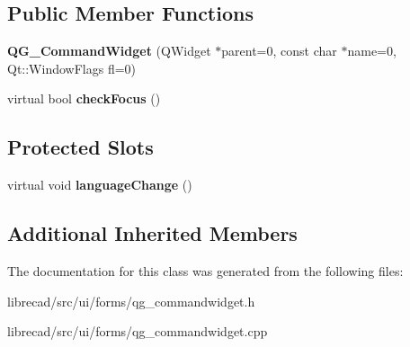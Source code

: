 \subsection*{Public Member Functions}
\begin{DoxyCompactItemize}
\item 
\hypertarget{classQG__CommandWidget_af437c9be473e893e77e6e208e02600be}{{\bfseries Q\-G\-\_\-\-Command\-Widget} (Q\-Widget $\ast$parent=0, const char $\ast$name=0, Qt\-::\-Window\-Flags fl=0)}\label{classQG__CommandWidget_af437c9be473e893e77e6e208e02600be}

\item 
\hypertarget{classQG__CommandWidget_a7bcd0c2b6c07aacb3accf4589f8cf0de}{virtual bool {\bfseries check\-Focus} ()}\label{classQG__CommandWidget_a7bcd0c2b6c07aacb3accf4589f8cf0de}

\end{DoxyCompactItemize}
\subsection*{Protected Slots}
\begin{DoxyCompactItemize}
\item 
\hypertarget{classQG__CommandWidget_a672e60c3529abdf3d546669ffb11fcc0}{virtual void {\bfseries language\-Change} ()}\label{classQG__CommandWidget_a672e60c3529abdf3d546669ffb11fcc0}

\end{DoxyCompactItemize}
\subsection*{Additional Inherited Members}


The documentation for this class was generated from the following files\-:\begin{DoxyCompactItemize}
\item 
librecad/src/ui/forms/qg\-\_\-commandwidget.\-h\item 
librecad/src/ui/forms/qg\-\_\-commandwidget.\-cpp\end{DoxyCompactItemize}
